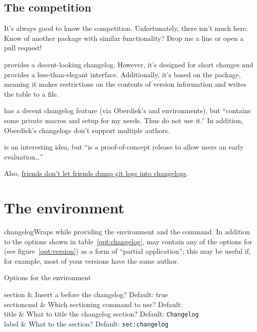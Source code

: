 \documentclass{ltxdoc}
\begin{document}
\subsection{The competition}

It's always good to know the competition. Unfortunately, there isn't much
here. Know of another package with similar functionality? Drop me a line or
open a pull request!

\begin{ctandescription}
	 provides a decent-looking changelog. However, it's
		designed for short changes and provides a less-than-elegant
		interface. Additionally, it's based on the 
		package, meaning it makes restrictions on the contents of
		version information and writes the table to a file.

	 has a decent changelog feature (via
		Oberdiek's  and  environments),
		but  ``contains some private macros and setup
		for my needs. Thus do not use it.'' In addition, Oberdiek's
		changelogs don't support multiple authors.

	 is an interesting idea, but  ``is a
		proof-of-concept release to allow users an early
		evaluation\dots''

		Also,
		\href{https://keepachangelog.com/en/1.0.0/}{friends don't
		let friends dump git logs into changelogs}.
\end{ctandescription}

\section{The  environment}

\begin{macro}{changelog}\AfterLastParam Wraps
 while providing the  environment and the
 command. In addition to the options shown in
table~\ref{opt:changelog},  may contain any of the options for
 (see figure~\ref{opt:version}) as a form of ``partial
application''; this may be useful if, for example, most of your versions
have the same author.

\begin{table}[h]
	\centering
	\caption{Options for the  environment}
	\label{opt:changelog}
	\begin{adjustwidth}{1in}{1in}
	\begin{Optionlist}
		section & Insert a  before the changelog?
			Default: true \\
		sectioncmd & Which sectioning command to use? Default:
			 \\
		title & What to title the changelog section? Default:
			\texttt{Changelog} \\
		label & What to  the section? Default:
			\texttt{sec:changelog} \\
	\end{Optionlist}
	\end{adjustwidth}
\end{table}
\end{macro}
\end{document}
